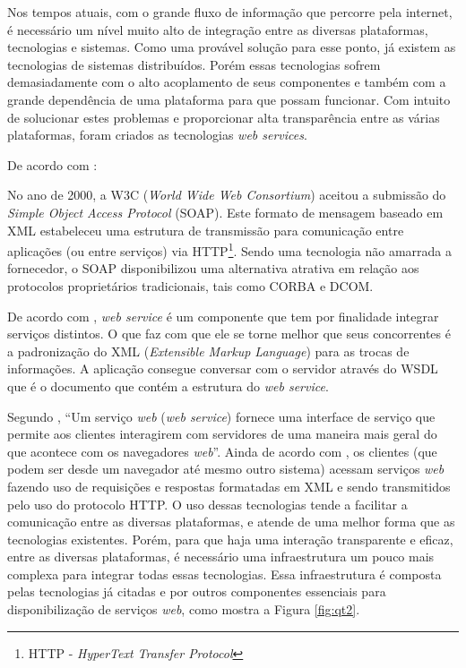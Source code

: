 	
	\par Nos tempos atuais, com o grande fluxo de informação que percorre pela
internet, é necessário um nível muito alto de integração entre as diversas
plataformas, tecnologias e sistemas. Como uma provável solução para esse ponto,
já existem as tecnologias de sistemas distribuídos. Porém essas tecnologias
sofrem demasiadamente com o alto acoplamento de seus componentes e também com a
grande dependência de uma plataforma para que possam funcionar. Com intuito de
solucionar estes problemas e proporcionar alta transparência entre as várias
plataformas, foram criados as tecnologias \textit{web services}.
	
	
	\par De acordo com :
	\begin{citacao}
		No ano de 2000, a W3C (\textit{World Wide Web Consortium}) aceitou a submissão
		do \textit{Simple Object Access Protocol} (SOAP). Este formato de mensagem
		baseado em XML estabeleceu uma estrutura de transmissão para comunicação entre
		aplicações (ou entre serviços) via HTTP\footnote{HTTP - \textit{HyperText
		Transfer Protocol}}. Sendo uma tecnologia não amarrada a fornecedor, o SOAP
		disponibilizou uma alternativa atrativa em relação aos protocolos
		proprietários tradicionais, tais como CORBA e DCOM.
	\end{citacao}
	
	\par De acordo com , \textit{web service} é um
componente que tem por finalidade integrar serviços distintos. O que faz com
que ele se torne melhor que seus concorrentes é a padronização do XML
(\textit{Extensible Markup Language}) para as trocas de informações. A
aplicação consegue conversar com o servidor através do  WSDL que é o documento
que contém a estrutura do \textit{web service}.
	
	\par Segundo , “Um serviço \textit{web} (\textit{web
service}) fornece uma interface de serviço que permite aos clientes interagirem
com servidores de uma maneira mais geral do que acontece com os navegadores
\textit{web}”. Ainda de acordo com , os clientes (que
podem ser desde um navegador até mesmo outro sistema) acessam serviços 
\textit{web} fazendo uso de requisições e respostas formatadas em XML e sendo
transmitidos pelo uso do protocolo HTTP. O uso dessas tecnologias tende a
facilitar a comunicação entre as diversas plataformas, e atende de uma
melhor forma que as tecnologias existentes. Porém, para que haja uma
interação transparente e eficaz, entre as diversas plataformas, é necessário uma
infraestrutura um pouco mais complexa para integrar todas essas tecnologias.
Essa infraestrutura é composta pelas tecnologias já citadas e por outros
componentes essenciais para disponibilização de serviços \textit{web}, como
mostra a Figura \ref{fig:qt2}.

